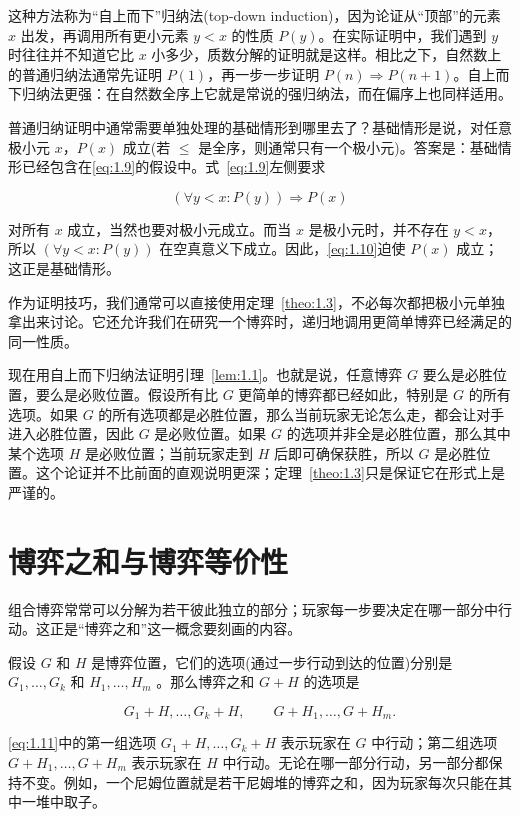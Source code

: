 这种方法称为“自上而下”归纳法(top-down induction)，因为论证从“顶部”的元素 \(x\) 出发，再调用所有更小元素 \(y<x\) 的性质 \(P(y)\)。在实际证明中，我们遇到 \(y\) 时往往并不知道它比 \(x\) 小多少，质数分解的证明就是这样。相比之下，自然数上的普通归纳法通常先证明 \(P(1)\)，再一步一步证明 \(P(n)\Rightarrow P(n+1)\)。自上而下归纳法更强：在自然数全序上它就是常说的强归纳法，而在偏序上也同样适用。

普通归纳证明中通常需要单独处理的基础情形到哪里去了？基础情形是说，对任意极小元 \(x\)，\(P(x)\) 成立(若 \(\leq\) 是全序，则通常只有一个极小元)。答案是：基础情形已经包含在\eqref{eq:1.9}的假设中。式~\eqref{eq:1.9}左侧要求

\begin{equation}
\left( {\forall y < x : P\left( y\right) }\right)  \Rightarrow  P\left( x\right) \label{eq:1.10}
\end{equation}

对所有 \(x\) 成立，当然也要对极小元成立。而当 \(x\) 是极小元时，并不存在 \(y<x\)，所以 \(\left( {\forall y < x : P\left( y\right) }\right)\) 在空真意义下成立。因此，\eqref{eq:1.10}迫使 \(P(x)\) 成立；这正是基础情形。

作为证明技巧，我们通常可以直接使用定理~\ref{theo:1.3}，不必每次都把极小元单独拿出来讨论。它还允许我们在研究一个博弈时，递归地调用更简单博弈已经满足的同一性质。

现在用自上而下归纳法证明引理~\ref{lem:1.1}。也就是说，任意博弈 \(G\) 要么是必胜位置，要么是必败位置。假设所有比 \(G\) 更简单的博弈都已经如此，特别是 \(G\) 的所有选项。如果 \(G\) 的所有选项都是必胜位置，那么当前玩家无论怎么走，都会让对手进入必胜位置，因此 \(G\) 是必败位置。如果 \(G\) 的选项并非全是必胜位置，那么其中某个选项 \(H\) 是必败位置；当前玩家走到 \(H\) 后即可确保获胜，所以 \(G\) 是必胜位置。这个论证并不比前面的直观说明更深；定理~\ref{theo:1.3}只是保证它在形式上是严谨的。

\section{ 博弈之和与博弈等价性}\label{sec-1.4}

组合博弈常常可以分解为若干彼此独立的部分；玩家每一步要决定在哪一部分中行动。这正是“博弈之和”这一概念要刻画的内容。

\begin{definition}\label{def:1.4} 假设 \(G\) 和 \(H\) 是博弈位置，它们的选项(通过一步行动到达的位置)分别是 \({G}_{1},\ldots ,{G}_{k}\) 和 \({H}_{1},\ldots ,{H}_{m}\) 。那么博弈之和 \(G + H\) 的选项是

\begin{equation}
{G}_{1} + H,\ldots ,{G}_{k} + H,\quad\quad G + {H}_{1},\ldots ,G + {H}_{m}.  \label{eq:1.11}
\end{equation}
\end{definition}
 \eqref{eq:1.11}中的第一组选项 \({G}_{1} + H,\ldots ,{G}_{k} + H\) 表示玩家在 \(G\) 中行动；第二组选项 \(G + {H}_{1},\ldots ,G + {H}_{m}\) 表示玩家在 \(H\) 中行动。无论在哪一部分行动，另一部分都保持不变。例如，一个尼姆位置就是若干尼姆堆的博弈之和，因为玩家每次只能在其中一堆中取子。

